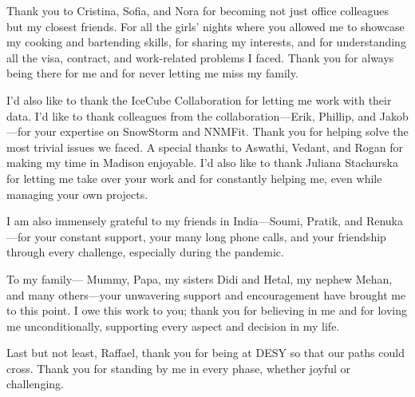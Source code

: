 Thank you to Cristina, Sofia, and Nora for becoming not just office colleagues but my closest friends. For all the girls' nights where you allowed me to showcase my cooking and bartending skills, for sharing my interests, and for understanding all the visa, contract, and work-related problems I faced. Thank you for always being there for me and for never letting me miss my family.

I'd also like to thank the IceCube Collaboration for letting me work with their data. I'd like to thank colleagues from the collaboration—Erik, Phillip, and Jakob—for your expertise on SnowStorm and NNMFit. Thank you for helping solve the most trivial issues we faced. A special thanks to Aswathi, Vedant, and Rogan for making my time in Madison enjoyable. I'd also like to thank Juliana Stachurska for letting me take over your work and for constantly helping me, even while managing your own projects.

I am also immensely grateful to my friends in India—Soumi, Pratik, and Renuka—for your constant support, your many long phone calls, and your friendship through every challenge, especially during the pandemic.

To my family— Mummy, Papa, my sisters Didi and Hetal, my nephew Mehan, and many others—your unwavering support and encouragement have brought me to this point. I owe this work to you; thank you for believing in me and for loving me unconditionally, supporting every aspect and decision in my life.

Last but not least, Raffael, thank you for being at DESY so that our paths could cross. Thank you for standing by me in every phase, whether joyful or challenging. 